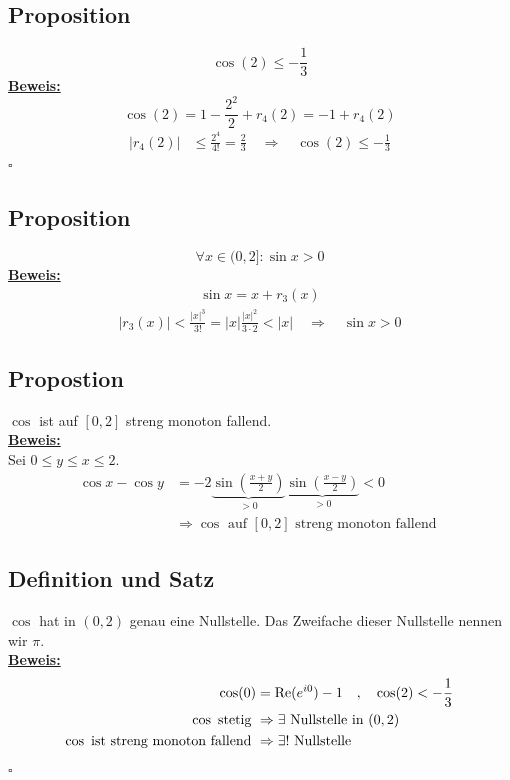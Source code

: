 \subsection{Proposition} %
\label{sub:proposition}
\[
	\cos (2) \le - \frac{1}{3} 
\]
\underline{\textbf{Beweis:}} \\
	\[
		\cos(2) = 1- \frac{2^2}{2} + r_4 (2) 
		= -1 + r_4 (2)
	\]
\begin{align*}
	| r_4 (2)| &\le \frac{2^4}{4!} = \frac{2}{3} \quad \Rightarrow \quad \cos (2) \le - \frac{1}{3}   
\end{align*}
\hfill \( \square \)

\subsection{Proposition} %
\label{sub:proposition}
\[
	\forall x \in (0,2] : \sin x > 0
\]
\underline{\textbf{Beweis:}} \\
\begin{align*}
	\sin x = x + r_3 (x)
\end{align*}
\begin{align*}
	| r_3 (x) | < \frac{|x|^3}{3!} = |x| \frac{|x|^2}{3 \cdot 2} < |x|  \quad \Rightarrow \quad \sin x > 0
\end{align*}

\subsection{Propostion} %
\label{sub:propostion}
$\cos$ ist auf $[0,2]$ streng monoton fallend.
\vspace{10pt} \\
\underline{\textbf{Beweis:}} \\
Sei $0 \le y \le x \le 2$. 
\begin{align*}
	\cos x - \cos y &= - 2 \underbrace{\sin \left( \frac{x+y}{2} \right)}_{>0} \underbrace{\sin \left(\frac{x-y}{2} \right)}_{>0}  < 0\tag{11.6 und 11.9} \\
	&\Rightarrow \cos \text{ auf } [0,2] \text{ streng monoton fallend }
\end{align*}


\subsection{Definition und Satz} %
\label{sub:definition}
$\cos$ hat in $(0,2)$ genau eine Nullstelle. Das Zweifache dieser Nullstelle nennen wir $\pi$.
\vspace{\baselineskip} \\
\underline{\textbf{Beweis:}} \\
\begin{align*}
	\cos (0) &= \operatorname{Re} (e^{i0}) -1 \quad  , \quad  \cos (2) < - \frac{1}{3} \\
	\cos \text{ stetig } &\Rightarrow  \exists \text{ Nullstelle in } (0,2) \\
	\cos \text{ ist streng monoton fallend } &\Rightarrow \exists! \text{ Nullstelle}
\end{align*}
\hfill \( \square \)

